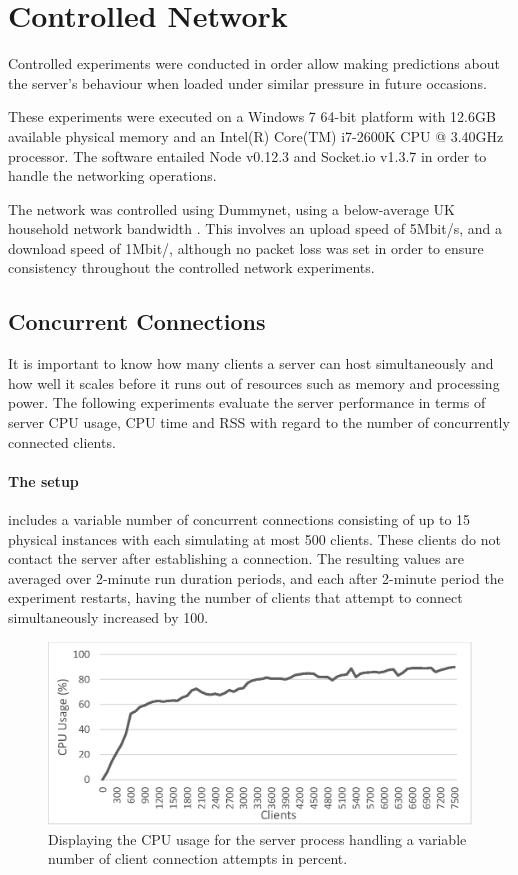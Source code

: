 \documentclass[bsc, 12pt, twoside, singlespacing, parskip, abbrevs, notimes, normalheadings, logo]{styles/infthesis}
\begin{document}
\section{Controlled Network}
Controlled experiments were conducted in order allow making predictions about the server's behaviour when loaded under similar pressure in future occasions.

These experiments were executed on a Windows 7 64-bit platform with 12.6GB available physical memory and an Intel(R) Core(TM) i7-2600K CPU @ 3.40GHz processor. The software entailed Node v0.12.3 and Socket.io v1.3.7 in order to handle the networking operations.

The network was controlled using Dummynet, using a below-average UK household network bandwidth \cite{household_bandwidth}. This involves an upload speed of 5Mbit/s, and a download speed of 1Mbit/, although no packet loss was set in order to ensure consistency throughout the controlled network experiments.

\subsection{Concurrent Connections}
It is important to know how many clients a server can host simultaneously and how well it scales before it runs out of resources such as memory and processing power. The following experiments evaluate the server performance in terms of server CPU usage, CPU time and RSS with regard to the number of concurrently connected clients.

\paragraph*{The setup} includes a variable number of concurrent connections consisting of up to 15 physical instances with each simulating at most 500 clients. These clients  do not contact the server after establishing a connection. The resulting values are averaged over 2-minute run duration periods, and each after 2-minute period the experiment restarts, having the number of clients that attempt to connect simultaneously increased by 100.

\begin{figure}[H]
\centering
\includegraphics[scale=0.9]{images/test_CLIENT_CPUusage.eps}
\caption{Displaying the CPU usage for the server process handling a variable number of client connection attempts in percent.}
\label{fig:cpu_usage}
\vspace{1em}
\end{figure}
\end{document}
